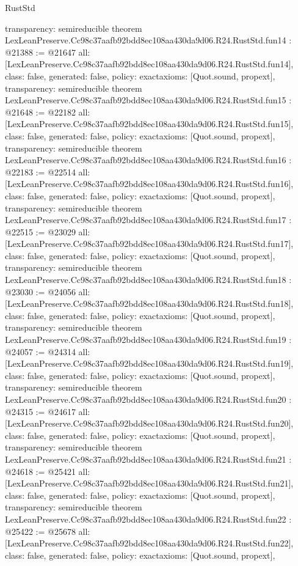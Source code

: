 \begin{lexlean}{RustStd}
\begin{coremodule}
{  transparency: semireducible
}
theorem LexLeanPreserve.Cc98c37aafb92bdd8ec108aa430da9d06.R24.RustStd.fun14 : @21388 := @21647 {
  all: [LexLeanPreserve.Cc98c37aafb92bdd8ec108aa430da9d06.R24.RustStd.fun14],
  class: false,
  generated: false,
  policy: exact{axioms: [Quot.sound, propext]},
  transparency: semireducible
}
theorem LexLeanPreserve.Cc98c37aafb92bdd8ec108aa430da9d06.R24.RustStd.fun15 : @21648 := @22182 {
  all: [LexLeanPreserve.Cc98c37aafb92bdd8ec108aa430da9d06.R24.RustStd.fun15],
  class: false,
  generated: false,
  policy: exact{axioms: [Quot.sound, propext]},
  transparency: semireducible
}
theorem LexLeanPreserve.Cc98c37aafb92bdd8ec108aa430da9d06.R24.RustStd.fun16 : @22183 := @22514 {
  all: [LexLeanPreserve.Cc98c37aafb92bdd8ec108aa430da9d06.R24.RustStd.fun16],
  class: false,
  generated: false,
  policy: exact{axioms: [Quot.sound, propext]},
  transparency: semireducible
}
theorem LexLeanPreserve.Cc98c37aafb92bdd8ec108aa430da9d06.R24.RustStd.fun17 : @22515 := @23029 {
  all: [LexLeanPreserve.Cc98c37aafb92bdd8ec108aa430da9d06.R24.RustStd.fun17],
  class: false,
  generated: false,
  policy: exact{axioms: [Quot.sound, propext]},
  transparency: semireducible
}
theorem LexLeanPreserve.Cc98c37aafb92bdd8ec108aa430da9d06.R24.RustStd.fun18 : @23030 := @24056 {
  all: [LexLeanPreserve.Cc98c37aafb92bdd8ec108aa430da9d06.R24.RustStd.fun18],
  class: false,
  generated: false,
  policy: exact{axioms: [Quot.sound, propext]},
  transparency: semireducible
}
theorem LexLeanPreserve.Cc98c37aafb92bdd8ec108aa430da9d06.R24.RustStd.fun19 : @24057 := @24314 {
  all: [LexLeanPreserve.Cc98c37aafb92bdd8ec108aa430da9d06.R24.RustStd.fun19],
  class: false,
  generated: false,
  policy: exact{axioms: [Quot.sound, propext]},
  transparency: semireducible
}
theorem LexLeanPreserve.Cc98c37aafb92bdd8ec108aa430da9d06.R24.RustStd.fun20 : @24315 := @24617 {
  all: [LexLeanPreserve.Cc98c37aafb92bdd8ec108aa430da9d06.R24.RustStd.fun20],
  class: false,
  generated: false,
  policy: exact{axioms: [Quot.sound, propext]},
  transparency: semireducible
}
theorem LexLeanPreserve.Cc98c37aafb92bdd8ec108aa430da9d06.R24.RustStd.fun21 : @24618 := @25421 {
  all: [LexLeanPreserve.Cc98c37aafb92bdd8ec108aa430da9d06.R24.RustStd.fun21],
  class: false,
  generated: false,
  policy: exact{axioms: [Quot.sound, propext]},
  transparency: semireducible
}
theorem LexLeanPreserve.Cc98c37aafb92bdd8ec108aa430da9d06.R24.RustStd.fun22 : @25422 := @25678 {
  all: [LexLeanPreserve.Cc98c37aafb92bdd8ec108aa430da9d06.R24.RustStd.fun22],
  class: false,
  generated: false,
  policy: exact{axioms: [Quot.sound, propext]},
}
\end{coremodule}
\end{lexlean}
